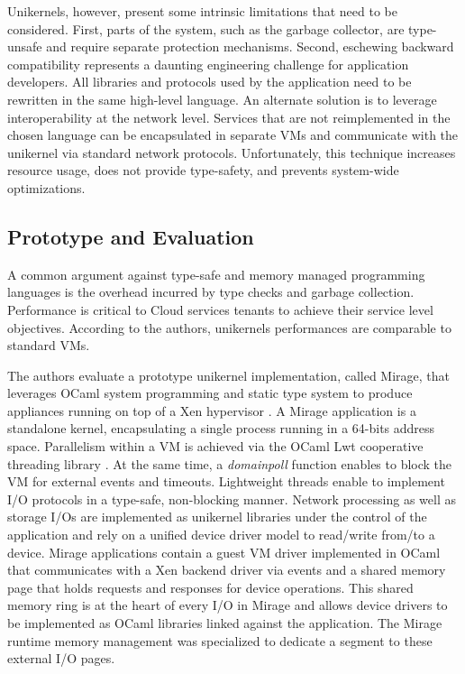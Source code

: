 Unikernels, however, present some intrinsic limitations that need to be considered.
First, parts of the system, such as the garbage collector, are type-unsafe and require separate protection mechanisms.
Second, eschewing backward compatibility represents a daunting engineering challenge for application developers.
All libraries and protocols used by the application need to be rewritten in the same high-level language.
An alternate solution is to leverage interoperability at the network level.
Services that are not reimplemented in the chosen language can be encapsulated in separate VMs and communicate with the unikernel via standard network protocols.
Unfortunately, this technique increases resource usage, does not provide type-safety, and prevents system-wide optimizations.


\subsection{Prototype and Evaluation}

A common argument against type-safe and memory managed programming languages is the overhead incurred by type checks and garbage collection.
Performance is critical to Cloud services tenants to achieve their service level objectives.
According to the authors, unikernels performances are comparable to standard VMs.

The authors evaluate a prototype unikernel implementation, called Mirage, that leverages OCaml system programming and static type system to produce appliances running on top of a Xen hypervisor \cite{DBLP:conf/sosp/BarhamDFHHHN03}.
A Mirage application is a standalone kernel, encapsulating a single process running in a 64-bits address space.
Parallelism within a VM is achieved via the OCaml Lwt cooperative threading library \cite{DBLP:conf/ml/Vouillon08}.
At the same time, a \emph{domainpoll} function enables to block the VM for external events and timeouts.
Lightweight threads enable to implement I/O protocols in a type-safe, non-blocking manner.
Network processing as well as storage I/Os are implemented as unikernel libraries under the control of the application and rely on a unified device driver model to read/write from/to a device.
Mirage applications contain a guest VM driver implemented in OCaml that communicates with a Xen backend driver via events and a shared memory page that holds requests and responses for device operations.
This shared memory ring is at the heart of every I/O in Mirage and allows device drivers to be implemented as OCaml libraries linked against the application.
The Mirage runtime memory management was specialized to dedicate a segment to these external I/O pages.

